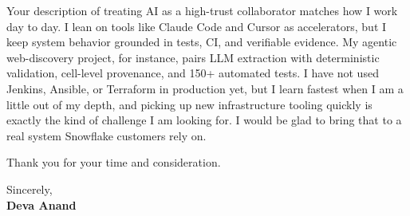 \documentclass[letterpaper,11pt]{article}
\begin{document}
Your description of treating AI as a high-trust collaborator matches how I work day to day. I lean on tools like Claude Code and Cursor as accelerators, but I keep system behavior grounded in tests, CI, and verifiable evidence. My agentic web-discovery project, for instance, pairs LLM extraction with deterministic validation, cell-level provenance, and 150+ automated tests. I have not used Jenkins, Ansible, or Terraform in production yet, but I learn fastest when I am a little out of my depth, and picking up new infrastructure tooling quickly is exactly the kind of challenge I am looking for. I would be glad to bring that to a real system Snowflake customers rely on.

Thank you for your time and consideration.

\vspace{6pt}
Sincerely, \\
\textbf{Deva Anand}
\end{document}
